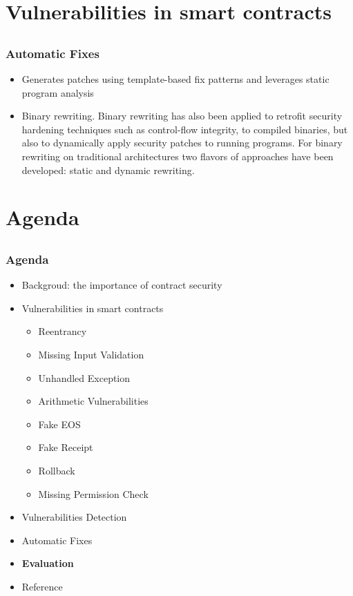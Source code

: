 \documentclass[notheorems, aspectratio=54]{beamer}
\begin{document}

\section{Vulnerabilities in smart contracts}
\subsection{}
\begin{frame}
    \frametitle{Automatic Fixes}

    \begin{itemize}
        \item Generates patches using template-based fix patterns and leverages static program analysis
        \item Binary rewriting. Binary rewriting has also been applied to retrofit security hardening techniques such as control-flow integrity, to compiled binaries, but also to dynamically apply security patches to running programs. For binary rewriting on traditional architectures two flavors of approaches have been developed: static and dynamic rewriting.
    \end{itemize}
    
\end{frame}


\section{Agenda}
\subsection{}
\begin{frame}
    \frametitle{Agenda}

    \begin{itemize}
        \item Backgroud: the importance of contract security
        \item Vulnerabilities in smart contracts
        \begin{itemize}
            \item Reentrancy
            \item Missing Input Validation
            \item Unhandled Exception
            \item Arithmetic Vulnerabilities
            \item Fake EOS
            \item Fake Receipt
            \item Rollback
            \item Missing Permission Check
        \end{itemize}
        \item Vulnerabilities Detection
        \item Automatic Fixes
        \item \textbf{Evaluation}
        \item Reference
    \end{itemize}
    
\end{frame}
\end{document}
